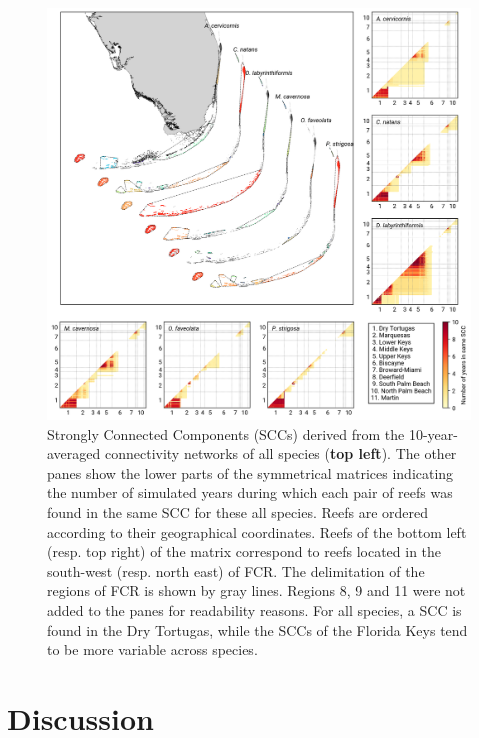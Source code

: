 \documentclass[preprint,12pt,authoryear]{elsarticle}
\begin{document}
	
	\begin{figure}
		\centering
		\includegraphics[width=.98\textwidth]{figures/comparison_sccs.png}
		\caption{Strongly Connected Components (SCCs) derived from the 10-year-averaged connectivity networks of all species (\textbf{top left}). The other panes show the lower parts of the symmetrical matrices indicating the number of simulated years during which each pair of reefs was found in the same SCC for these all species. Reefs are ordered according to their geographical coordinates. Reefs of the bottom left (resp. top right) of the matrix correspond to reefs located in the south-west (resp. north east) of FCR. The delimitation of the regions of FCR is shown by gray lines. Regions 8, 9 and 11 were not added to the panes for readability reasons. For all species, a SCC is found in the Dry Tortugas, while the SCCs of the Florida Keys tend to be more variable across species.}\label{fig:scc}
	\end{figure}
	
	
	\section*{Discussion}
	
\end{document}
